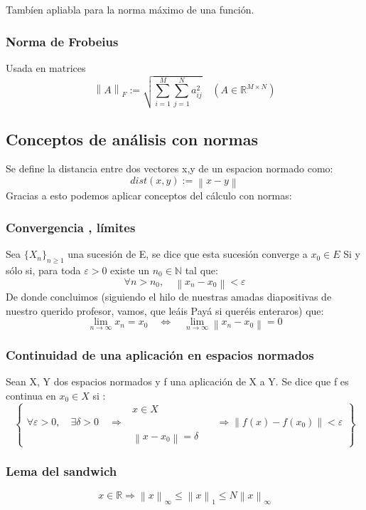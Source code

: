 \documentclass[a4paper , 11pt, spanish ]{article}
\newcommand{\norm}[1]{\left\lVert#1\right\rVert}
\begin{document}
Tambíen apliabla para la norma máximo de una función. 
\subsubsection*{Norma de Frobeius}
Usada en matrices
\[ \norm{A}_F := \sqrt{ \sum_{i=1}^{M} \sum_{j=1}^{N} a_{ij}^2} \quad (A \in \mathbb{R}^{M \times N}) \]

\subsection{ Conceptos de análisis con normas }
Se define la distancia entre dos vectores x,y  de un espacion normado como:
$$ dist(x,y) := \norm{x -y} $$  
Gracias a esto podemos aplicar conceptos del cálculo con normas:

\subsubsection*{Convergencia , límites }  
Sea $ \{{ X_n\}}_{n \ge 1} $ una sucesión de E, se dice que esta sucesión converge a $ x_0 \in E $  
Si y sólo si, para toda $\varepsilon > 0 $  existe un $n_0 \in \mathbb{N}$ tal que: 
$$ \forall  n > n_0, \quad \norm{ x_n - x_0 } < \varepsilon $$   
De donde concluimos (siguiendo el hilo de nuestras amadas diapositivas de nuestro querido profesor, vamos, que leáis Payá si queréis enteraros) que:
$$ \lim_{n \to 	\infty}{ x_n} = x_0 	\quad \Leftrightarrow \quad \lim_{n \to 	\infty}{ \norm {x_n - x_0 } } = 0 $$

\subsubsection*{Continuidad de una aplicación en espacios normados} 
Sean X, Y dos espacios normados y f una aplicación de X a Y. Se dice que f es continua en $x_0 \in X$  si :
 $$\begin{Bmatrix}


	& x \in X & \\
	\forall \varepsilon > 0 , \quad \exists \delta > 0 \quad \Rightarrow & & 	\quad \Rightarrow  	\norm{f(x) - f(x_0)} <	\varepsilon  \\
	& \norm{x - x_0}=\delta & 
\end{Bmatrix}$$

\subsubsection*{Lema del sandwich}
$$ x \in \mathbb{R} \Rightarrow \norm{x}_\infty \le \norm{x}_1 \le N\norm{x}_\infty $$
\end{document}
